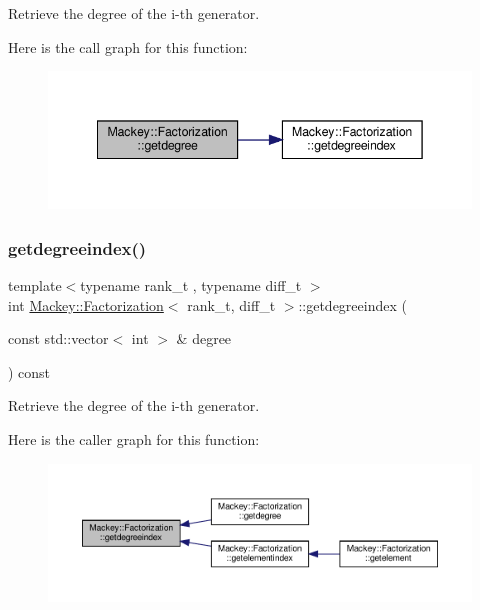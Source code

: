 Retrieve the degree of the i-\/th generator. 

Here is the call graph for this function\+:\nopagebreak
\begin{figure}[H]
\begin{center}
\leavevmode
\includegraphics[width=342pt]{classMackey_1_1Factorization_a273e9318c0a5eacacd584474f93ffe4a_cgraph}
\end{center}
\end{figure}
\mbox{\label{classMackey_1_1Factorization_ab90f461af3418417970d4be8682e965d}} 
\subsubsection{\texorpdfstring{getdegreeindex()}{getdegreeindex()}}
{\footnotesize\ttfamily template$<$typename rank\+\_\+t , typename diff\+\_\+t $>$ \\
int \hyperlink{classMackey_1_1Factorization}{Mackey\+::\+Factorization}$<$ rank\+\_\+t, diff\+\_\+t $>$\+::getdegreeindex (\begin{DoxyParamCaption}\item[{const std\+::vector$<$ int $>$ \&}]{degree }\end{DoxyParamCaption}) const\hspace{0.3cm}{\ttfamily [inline]}}



Retrieve the degree of the i-\/th generator. 

Here is the caller graph for this function\+:\nopagebreak
\begin{figure}[H]
\begin{center}
\leavevmode
\includegraphics[width=350pt]{classMackey_1_1Factorization_ab90f461af3418417970d4be8682e965d_icgraph}
\end{center}
\end{figure}
\mbox{\label{classMackey_1_1Factorization_a6e15f1fb3623685326255f7badf7eee9}} 
